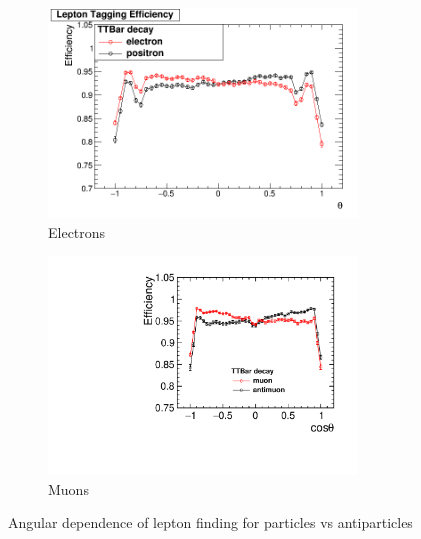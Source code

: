 \begin{figure}
  \centering
  \begin{subfigure}{.5\textwidth}
    \centering
    \includegraphics[width=0.9\textwidth]{TopAnalysis/figures/ElectronEfficiencys.png}
    \caption[Charge Tagging Efficiency]{Electrons}
    \label{fig:electronefficiency}
  \end{subfigure}%
  \begin{subfigure}{.5\textwidth}
    \centering
    \includegraphics[width=0.9\textwidth]{TopAnalysis/figures/MuonEfficiencys}
    \caption[Charge Tagging Efficiency]{Muons}
    \label{fig:muonefficiency}
  \end{subfigure}
  \caption{Angular dependence of lepton finding for particles vs antiparticles}
  \label{fig:chargeEfficiencies}
\end{figure}

